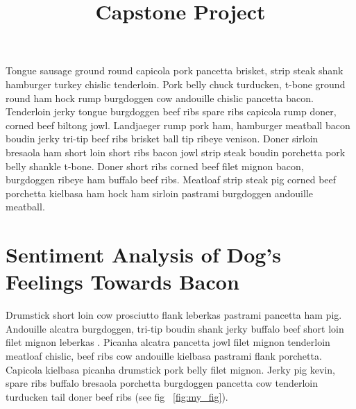 \documentclass[stu,floatsintext]{apa7}
\begin{document}
\title{Capstone Project}




\maketitle
Tongue sausage ground round capicola pork pancetta brisket, strip steak shank hamburger turkey chislic tenderloin. Pork belly chuck turducken, t-bone ground round ham hock rump burgdoggen cow andouille chislic pancetta bacon. Tenderloin jerky tongue burgdoggen beef ribs spare ribs capicola rump doner, corned beef biltong jowl. Landjaeger rump pork ham, hamburger meatball bacon boudin jerky tri-tip beef ribs brisket ball tip ribeye venison. Doner sirloin bresaola ham short loin short ribs bacon jowl strip steak boudin porchetta pork belly shankle t-bone. Doner short ribs corned beef filet mignon bacon, burgdoggen ribeye ham buffalo beef ribs. Meatloaf strip steak pig corned beef porchetta kielbasa ham hock ham sirloin pastrami burgdoggen andouille meatball.

\newpage

\section{Sentiment Analysis of Dog's Feelings Towards Bacon}

Drumstick short loin cow prosciutto flank leberkas pastrami pancetta ham pig. Andouille alcatra burgdoggen, tri-tip boudin shank jerky buffalo beef short loin \textcite{greenwade93} filet mignon leberkas \parencite{huff2010lie}. Picanha alcatra pancetta jowl filet mignon tenderloin meatloaf chislic, beef ribs cow andouille kielbasa pastrami flank porchetta. Capicola kielbasa picanha drumstick pork belly filet mignon. Jerky pig kevin, spare ribs buffalo bresaola porchetta burgdoggen pancetta cow tenderloin turducken tail doner beef ribs (see fig ~\ref{fig:my_fig}). 
\end{document}
